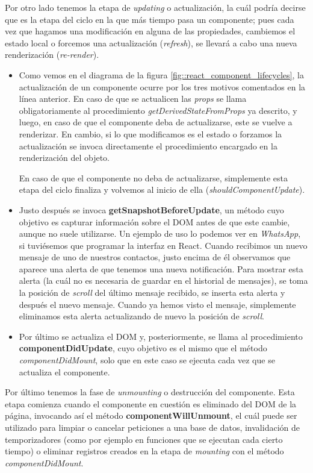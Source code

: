 \documentclass[../main.tex]{subfiles}
\begin{document}
    Por otro lado tenemos la etapa de \textit{updating} o actualización, la cuál podría decirse que es la etapa del ciclo en la que más tiempo pasa un componente; pues cada vez que hagamos una modificación en alguna de las propiedades, cambiemos el estado local o forcemos una actualización (\textit{refresh}), se llevará a cabo una nueva renderización (\textit{re-render}). 

    \begin{itemize}
        \item Como vemos en el diagrama de la figura \ref{fig::react_component_lifecycles}, la actualización de un componente ocurre por los tres motivos comentados en la línea anterior. En caso de que se actualicen las \textit{props} se llama obligatoriamente al procedimiento \textit{getDerivedStateFromProps} ya descrito, y luego, en caso de que el componente deba de actualizarse, este se vuelve a renderizar. En cambio, si lo que modificamos es el estado o forzamos la actualización se invoca directamente el procedimiento encargado en la renderización del objeto.
        
        En caso de que el componente no deba de actualizarse, simplemente esta etapa del ciclo finaliza y volvemos al inicio de ella (\textit{shouldComponentUpdate}).
        
        \item Justo después se invoca \textbf{getSnapshotBeforeUpdate}, un método cuyo objetivo es capturar información sobre el DOM antes de que este cambie, aunque no suele utilizarse. Un ejemplo de uso lo podemos ver en \textit{WhatsApp}, si tuviésemos que programar la interfaz en React. Cuando recibimos un nuevo mensaje de uno de nuestros contactos, justo encima de él observamos que aparece una alerta de que tenemos una nueva notificación. Para mostrar esta alerta (la cuál no es necesaria de guardar en el historial de mensajes), se toma la posición de \textit{scroll} del último mensaje recibido, se inserta esta alerta y después el nuevo mensaje. Cuando ya hemos visto el mensaje, simplemente eliminamos esta alerta actualizando de nuevo la posición de \textit{scroll}.
        
        \item Por último se actualiza el DOM y, posteriormente, se llama al procedimiento \textbf{componentDidUpdate}, cuyo objetivo es el mismo que el método \textit{componentDidMount}, solo que en este caso se ejecuta cada vez que se actualiza el componente. 
        
    \end{itemize}
    Por último tenemos la fase de \textit{unmounting} o destrucción del componente. Esta etapa comienza cuando el componente en cuestión es eliminado del DOM de la página, invocando así el método \textbf{componentWillUnmount}, el cuál puede ser utilizado para limpiar o cancelar peticiones a una base de datos, invalidación de temporizadores (como por ejemplo en funciones que se ejecutan cada cierto tiempo) o eliminar registros creados en la etapa de \textit{mounting} con el método \textit{componentDidMount}.\\
    
\end{document}
